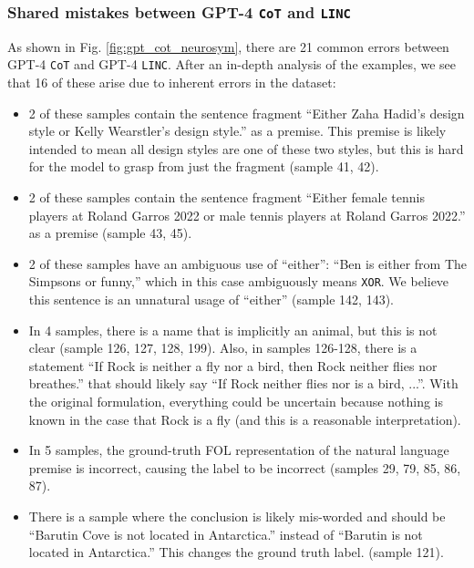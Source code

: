 \subsubsection{Shared mistakes between GPT-4 \texttt{CoT} and \texttt{LINC}} \label{sec:appendix_sharedmistakes}
As shown in Fig. \ref{fig:gpt_cot_neurosym}, there are 21 common errors between GPT-4 \texttt{CoT} and GPT-4 \texttt{LINC}. After an in-depth analysis of the examples, we see that 16 of these arise due to inherent errors in the dataset:
\begin{itemize}
\item 2 of these samples contain the sentence fragment ``Either Zaha Hadid's design style or Kelly Wearstler's design style.'' as a premise. This premise is likely intended to mean all design styles are one of these two styles, but this is hard for the model to grasp from just the fragment (sample 41, 42).
\item 2 of these samples contain the sentence fragment ``Either female tennis players at Roland Garros 2022 or male tennis players at Roland Garros 2022.'' as a premise (sample 43, 45).
\item 2 of these samples have an ambiguous use of ``either'': ``Ben is either from The Simpsons or funny,'' which in this case ambiguously means \texttt{XOR}. We believe this sentence is an unnatural usage of ``either'' (sample 142, 143).
\item In 4 samples, there is a name that is implicitly an animal, but this is not clear (sample 126, 127, 128, 199). Also, in samples 126-128, there is a statement ``If Rock is neither a fly nor a bird, then Rock neither flies nor breathes.'' that should likely say ``If Rock neither flies nor is a bird, ...''. With the original formulation, everything could be uncertain because nothing is known in the case that Rock is a fly (and this is a reasonable interpretation).
\item In 5 samples, the ground-truth FOL representation of the natural language premise is incorrect, causing the label to be incorrect (samples 29, 79, 85, 86, 87).
\item There is a sample where the conclusion is likely mis-worded and should be ``Barutin Cove is not located in Antarctica.'' instead of ``Barutin is not located in Antarctica.'' This changes the ground truth label. (sample 121).
\end{itemize}

